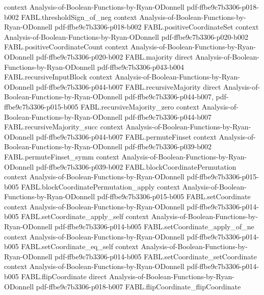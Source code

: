 \begin{theorem}
  {context}
  {Analysis-of-Boolean-Functions-by-Ryan-ODonnell}
  {pdf-ffbe9c7b3306-p018-b002}
\proofstep
  {FABL.thresholdSign_of_neg}
  {context}
  {Analysis-of-Boolean-Functions-by-Ryan-ODonnell}
  {pdf-ffbe9c7b3306-p018-b002}
\proofstep
  {FABL.positiveCoordinateSet}
  {context}
  {Analysis-of-Boolean-Functions-by-Ryan-ODonnell}
  {pdf-ffbe9c7b3306-p020-b002}
\proofstep
  {FABL.positiveCoordinateCount}
  {context}
  {Analysis-of-Boolean-Functions-by-Ryan-ODonnell}
  {pdf-ffbe9c7b3306-p020-b002}
\proofstep
  {FABL.majority}
  {direct}
  {Analysis-of-Boolean-Functions-by-Ryan-ODonnell}
  {pdf-ffbe9c7b3306-p043-b004}
\proofstep
  {FABL.recursiveInputBlock}
  {context}
  {Analysis-of-Boolean-Functions-by-Ryan-ODonnell}
  {pdf-ffbe9c7b3306-p044-b007}
\proofstep
  {FABL.recursiveMajority}
  {direct}
  {Analysis-of-Boolean-Functions-by-Ryan-ODonnell}
  {pdf-ffbe9c7b3306-p044-b007,
    pdf-ffbe9c7b3306-p015-b005}
\proofstep
  {FABL.recursiveMajority_zero}
  {context}
  {Analysis-of-Boolean-Functions-by-Ryan-ODonnell}
  {pdf-ffbe9c7b3306-p044-b007}
\proofstep
  {FABL.recursiveMajority_succ}
  {context}
  {Analysis-of-Boolean-Functions-by-Ryan-ODonnell}
  {pdf-ffbe9c7b3306-p044-b007}
\proofstep
  {FABL.permuteFinset}
  {context}
  {Analysis-of-Boolean-Functions-by-Ryan-ODonnell}
  {pdf-ffbe9c7b3306-p039-b002}
\proofstep
  {FABL.permuteFinset_symm}
  {context}
  {Analysis-of-Boolean-Functions-by-Ryan-ODonnell}
  {pdf-ffbe9c7b3306-p039-b002}
\proofstep
  {FABL.blockCoordinatePermutation}
  {context}
  {Analysis-of-Boolean-Functions-by-Ryan-ODonnell}
  {pdf-ffbe9c7b3306-p015-b005}
\proofstep
  {FABL.blockCoordinatePermutation_apply}
  {context}
  {Analysis-of-Boolean-Functions-by-Ryan-ODonnell}
  {pdf-ffbe9c7b3306-p015-b005}
\proofstep
  {FABL.setCoordinate}
  {context}
  {Analysis-of-Boolean-Functions-by-Ryan-ODonnell}
  {pdf-ffbe9c7b3306-p014-b005}
\proofstep
  {FABL.setCoordinate_apply_self}
  {context}
  {Analysis-of-Boolean-Functions-by-Ryan-ODonnell}
  {pdf-ffbe9c7b3306-p014-b005}
\proofstep
  {FABL.setCoordinate_apply_of_ne}
  {context}
  {Analysis-of-Boolean-Functions-by-Ryan-ODonnell}
  {pdf-ffbe9c7b3306-p014-b005}
\proofstep
  {FABL.setCoordinate_eq_self}
  {context}
  {Analysis-of-Boolean-Functions-by-Ryan-ODonnell}
  {pdf-ffbe9c7b3306-p014-b005}
\proofstep
  {FABL.setCoordinate_setCoordinate}
  {context}
  {Analysis-of-Boolean-Functions-by-Ryan-ODonnell}
  {pdf-ffbe9c7b3306-p014-b005}
\proofstep
  {FABL.flipCoordinate}
  {direct}
  {Analysis-of-Boolean-Functions-by-Ryan-ODonnell}
  {pdf-ffbe9c7b3306-p018-b007}
\proofstep
  {FABL.flipCoordinate_flipCoordinate}

\end{theorem}
